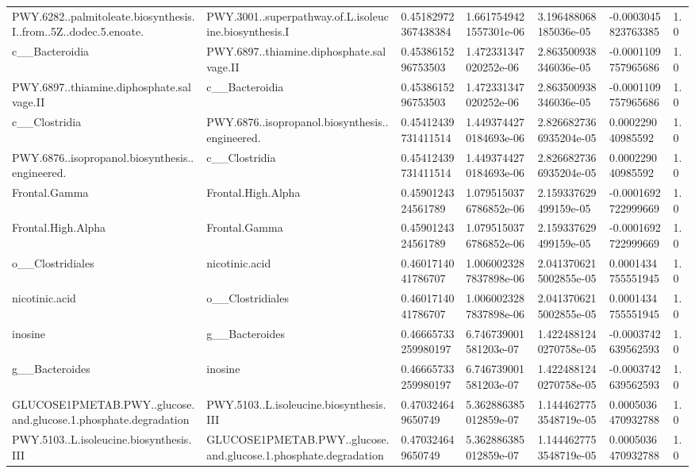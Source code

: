 \begin{longtable}{lllllll}
PWY.6282..palmitoleate.biosynthesis.I..from..5Z..dodec.5.enoate. & PWY.3001..superpathway.of.L.isoleucine.biosynthesis.I & 0.45182972367438384 & 1.6617549421557301e-06 & 3.196488068185036e-05 & -0.0003045823763385 & 1.0 \\
c\_\_Bacteroidia & PWY.6897..thiamine.diphosphate.salvage.II & 0.4538615296753503 & 1.472331347020252e-06 & 2.863500938346036e-05 & -0.0001109757965686 & 1.0 \\
PWY.6897..thiamine.diphosphate.salvage.II & c\_\_Bacteroidia & 0.4538615296753503 & 1.472331347020252e-06 & 2.863500938346036e-05 & -0.0001109757965686 & 1.0 \\
c\_\_Clostridia & PWY.6876..isopropanol.biosynthesis..engineered. & 0.45412439731411514 & 1.4493744270184693e-06 & 2.8266827366935204e-05 & 0.000229040985592 & 1.0 \\
PWY.6876..isopropanol.biosynthesis..engineered. & c\_\_Clostridia & 0.45412439731411514 & 1.4493744270184693e-06 & 2.8266827366935204e-05 & 0.000229040985592 & 1.0 \\
Frontal.Gamma & Frontal.High.Alpha & 0.4590124324561789 & 1.0795150376786852e-06 & 2.159337629499159e-05 & -0.0001692722999669 & 1.0 \\
Frontal.High.Alpha & Frontal.Gamma & 0.4590124324561789 & 1.0795150376786852e-06 & 2.159337629499159e-05 & -0.0001692722999669 & 1.0 \\
o\_\_Clostridiales & nicotinic.acid & 0.4601714041786707 & 1.0060023287837898e-06 & 2.0413706215002855e-05 & 0.0001434755551945 & 1.0 \\
nicotinic.acid & o\_\_Clostridiales & 0.4601714041786707 & 1.0060023287837898e-06 & 2.0413706215002855e-05 & 0.0001434755551945 & 1.0 \\
inosine & g\_\_Bacteroides & 0.46665733259980197 & 6.746739001581203e-07 & 1.4224881240270758e-05 & -0.0003742639562593 & 1.0 \\
g\_\_Bacteroides & inosine & 0.46665733259980197 & 6.746739001581203e-07 & 1.4224881240270758e-05 & -0.0003742639562593 & 1.0 \\
GLUCOSE1PMETAB.PWY..glucose.and.glucose.1.phosphate.degradation & PWY.5103..L.isoleucine.biosynthesis.III & 0.470324649650749 & 5.362886385012859e-07 & 1.1444627753548719e-05 & 0.0005036470932788 & 1.0 \\
PWY.5103..L.isoleucine.biosynthesis.III & GLUCOSE1PMETAB.PWY..glucose.and.glucose.1.phosphate.degradation & 0.470324649650749 & 5.362886385012859e-07 & 1.1444627753548719e-05 & 0.0005036470932788 & 1.0 \\

\end{longtable}
